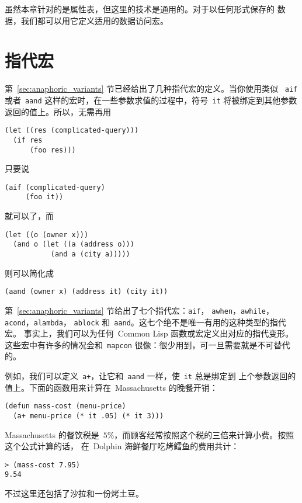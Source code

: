 虽然本章针对的是属性表，但这里的技术是通用的。对于以任何形式保存的
数据，我们都可以用它定义适用的数据访问宏。

\section{指代宏}
\label{sec:anaphoric_macros}

第~\ref{sec:anaphoric_variants} 节已经给出了几种指代宏的定义。当你使用类似
~\texttt{aif} 或者~\texttt{aand} 这样的宏时，在一些参数求值的过程中，符号~\texttt{it}
将被绑定到其他参数返回的值上。所以，无需再用
\begin{lstlisting}
(let ((res (complicated-query)))
  (if res
      (foo res)))
\end{lstlisting}
只要说
\begin{lstlisting}
(aif (complicated-query)
     (foo it))
\end{lstlisting}
就可以了，而
\begin{lstlisting}
(let ((o (owner x)))
  (and o (let ((a (address o)))
           (and a (city a)))))
\end{lstlisting}
则可以简化成
\begin{lstlisting}
(aand (owner x) (address it) (city it))
\end{lstlisting}
第~\ref{sec:anaphoric_variants} 节给出了七个指代宏：\texttt{aif}，
\texttt{awhen}，\texttt{awhile}，\texttt{acond}，\texttt{alambda}，
\texttt{ablock} 和~\texttt{aand}。这七个绝不是唯一有用的这种类型的指代宏。
事实上，我们可以为任何~Common Lisp 函数或宏定义出对应的指代变形。
这些宏中有许多的情况会和~\texttt{mapcon} 很像：很少用到，可一旦需要就是不可替代的。

例如，我们可以定义~\texttt{a+}，让它和~\texttt{aand} 一样，使~\texttt{it} 总是绑定到
上个参数返回的值上。下面的函数用来计算在~Massachusetts 的晚餐开销：
\begin{lstlisting}
(defun mass-cost (menu-price)
  (a+ menu-price (* it .05) (* it 3)))
\end{lstlisting}
Massachusetts 的餐饮税是~$5\%$，而顾客经常按照这个税的三倍来计算小费。按照这个公式计算的话，
在~Dolphin 海鲜餐厅吃烤鳕鱼的费用共计：
\begin{lstlisting}
> (mass-cost 7.95)
9.54
\end{lstlisting}
不过这里还包括了沙拉和一份烤土豆。


